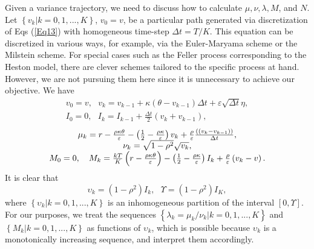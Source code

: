 \documentclass{article}
\begin{document}
Given a variance trajectory, we need to discuss how to calculate $\mu ,\nu
,\lambda ,M$, and $N$. Let $\left\{ v_{k}|k=0,1,...,K\right\} $, $v_{0}=v$,
be a particular path generated via discretization of Eqs (\ref{Eq13}) with
homogeneous time-step $\Delta t=T/K$. This equation can be discretized in
various ways, for example, via the Euler-Maryama scheme or the Milstein
scheme. For special cases such as the Feller process corresponding to the
Heston model, there are clever schemes tailored to the specific process at
hand. However, we are not pursuing them here since it is unnecessary to
achieve our objective. We have%
\begin{equation}
\begin{array}{c}
v_{0}=v,\ \ \ v_{k}=v_{k-1}+\kappa \left( \theta -v_{k-1}\right) \Delta
t+\varepsilon \sqrt{\Delta t}\eta , \\ 
I_{0}=0,\ \ \ I_{k}=I_{k-1}+\frac{\Delta t}{2}\left( v_{k}+v_{k-1}\right) ,%
\end{array}
\label{Eq42}
\end{equation}%
\begin{equation}
\begin{array}{c}
\mu_{k}=r-\frac{\rho \kappa \theta }{\varepsilon }-\left( \frac{1}{2}-\frac{%
\rho \kappa }{\varepsilon }\right) v_{k}+\frac{\rho }{\varepsilon }\frac{%
\left( \left( v_{k}-v_{k-1}\right) \right) }{\Delta t}, \\ 
\nu _{k}=\sqrt{1-\rho ^{2}}\sqrt{v_{k}}, \\ 
M_{0}=0,\ \ \ M_{k}=\frac{kT}{K}\left( r-\frac{\rho \kappa \theta }{%
\varepsilon }\right) -\left( \frac{1}{2}-\frac{\rho \kappa }{\varepsilon }%
\right) I_{k}+\frac{\rho }{\varepsilon }\left( v_{k}-v\right) .%
\end{array}
\label{Eq43}
\end{equation}%
It is clear that%
\begin{equation}
\upsilon _{k}=\left( 1-\rho ^{2}\right) I_{k},\ \ \ \Upsilon =\left( 1-\rho
^{2}\right) I_{K},  \label{Eq44}
\end{equation}%
where $\left\{ \upsilon _{k}|k=0,1,...,K\right\} $ is an inhomogeneous
partition of the interval $\left[ 0,\Upsilon \right] $. For our purposes, we
treat the sequences $\left\{ \lambda _{k}=\mu _{k}/\nu
_{k}|k=0,1,...,K\right\} $ and \newline
$\left\{ M_{k}|k=0,1,...,K\right\} $ as functions of $\upsilon _{k}$, which
is possible because $\upsilon _{k}$ is a monotonically increasing sequence,
and interpret them accordingly.
\end{document}
